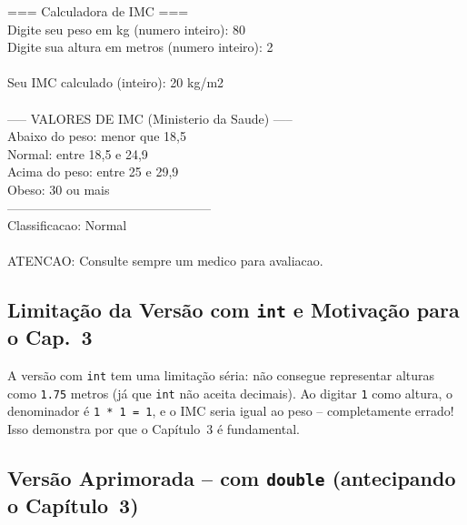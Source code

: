 \documentclass[12pt,a4paper]{article}
\begin{document}
\begin{respostabox}
\begin{saida}
=== Calculadora de IMC ===\\
Digite seu peso em kg (numero inteiro): 80\\
Digite sua altura em metros (numero inteiro): 2\\
\\
Seu IMC calculado (inteiro): 20 kg/m2\\
\\
----- VALORES DE IMC (Ministerio da Saude) -----\\
Abaixo do peso:   menor que 18,5\\
Normal:           entre 18,5 e 24,9\\
Acima do peso:    entre 25 e 29,9\\
Obeso:            30 ou mais\\
------------------------------------------------\\
Classificacao: Normal\\
\\
ATENCAO: Consulte sempre um medico para avaliacao.
\end{saida}
\end{respostabox}

\subsection{Limitação da Versão com \texttt{int} e Motivação para o Cap.~3}

\begin{atencao}
A versão com \texttt{int} tem uma limitação séria: não consegue representar alturas
como \texttt{1.75} metros (já que \texttt{int} não aceita decimais). Ao digitar
\texttt{1} como altura, o denominador é \texttt{1 * 1 = 1}, e o IMC seria igual ao
peso -- completamente errado! Isso demonstra por que o Capítulo~3 é fundamental.
\end{atencao}

\subsection{Versão Aprimorada -- com \texttt{double} (antecipando o Capítulo~3)}
\end{document}
